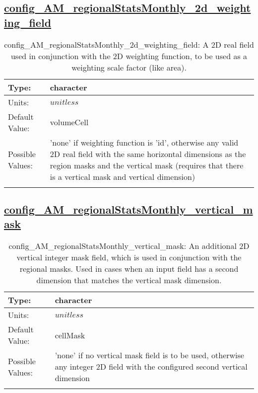 \subsection[config\_AM\_regionalStatsMonthly\_2d\_weighting\_field]{\hyperref[sec:nm_tab_AM_regionalStatsMonthly]{config\_AM\_regionalStatsMonthly\_2d\_weighting\_field}}
\label{subsec:nm_sec_config_AM_regionalStatsMonthly_2d_weighting_field}
\begin{center}
\begin{longtable}{| p{2.0in} || p{4.0in} |}
    \hline
    Type: & character \\
    \hline
    Units: & $unitless$ \\
    \hline
    Default Value: & volumeCell \\
    \hline
    Possible Values: & 'none' if weighting function is 'id', otherwise any valid 2D real field with the same horizontal dimensions as the region masks and the vertical mask (requires that there is a vertical mask and vertical dimension) \\
    \hline
    \caption{config\_AM\_regionalStatsMonthly\_2d\_weighting\_field: A 2D real field used in conjunction with the 2D weighting function, to be used as a weighting scale factor (like area).}
\end{longtable}
\end{center}
\subsection[config\_AM\_regionalStatsMonthly\_vertical\_mask]{\hyperref[sec:nm_tab_AM_regionalStatsMonthly]{config\_AM\_regionalStatsMonthly\_vertical\_mask}}
\label{subsec:nm_sec_config_AM_regionalStatsMonthly_vertical_mask}
\begin{center}
\begin{longtable}{| p{2.0in} || p{4.0in} |}
    \hline
    Type: & character \\
    \hline
    Units: & $unitless$ \\
    \hline
    Default Value: & cellMask \\
    \hline
    Possible Values: & 'none' if no vertical mask field is to be used, otherwise any integer 2D field with the configured second vertical dimension \\
    \hline
    \caption{config\_AM\_regionalStatsMonthly\_vertical\_mask: An additional 2D vertical integer mask field, which is used in conjunction with the regional masks. Used in cases when an input field has a second dimension that matches the vertical mask dimension.}
\end{longtable}
\end{center}
